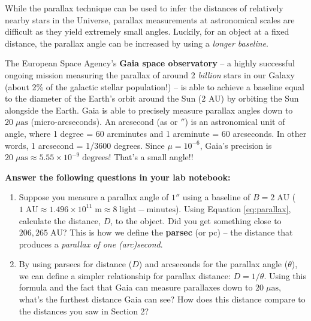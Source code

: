 \documentclass[11pt]{article}
\begin{document}
While the parallax technique can be used to infer the distances of relatively nearby stars in the Universe, parallax measurements at astronomical scales are difficult as they yield extremely small angles. Luckily, for an object at a fixed distance, the parallax angle can be increased by using a \emph{longer baseline}. 

\medskip \noindent
The European Space Agency's \textbf{Gaia space observatory} -- a highly successful ongoing mission measuring the parallax of around 2 \emph{billion} stars in our Galaxy (about 2\% of the galactic stellar population!) -- is able to achieve a baseline equal to the diameter of the Earth's orbit around the Sun (2 AU) by orbiting the Sun alongside the Earth. Gaia is able to precisely measure parallax angles down to $20\;\mu\mathrm{as}$ (micro-arcseconds). An arcsecond (as or $''$) is an astronomical unit of angle, where 1 degree = 60 arcminutes and 1 arcminute = 60 arcseconds. In other words, 1 arcsecond = 1/3600 degrees. Since $\mu = 10^{-6}$, Gaia's precision is $20\;\mu\mathrm{as}\approx 5.55\times 10^{-9}\;\mathrm{degrees}$! That's a small angle!!

\textbf{Answer the following questions in your lab notebook:}

\begin{enumerate}[resume]
    \item Suppose you measure a parallax angle of $1''$ using a baseline of $B=2\;\mathrm{AU}$ ($1\;\mathrm{AU} \approx 1.496\times 10^{11}\;\mathrm{m} \approx 8\;\mathrm{light{-}minutes}$). Using Equation \ref{eq:parallax}, calculate the distance, $D$, to the object. Did you get something close to $206,265\;\mathrm{AU}$? This is how we define the \textbf{parsec} (or pc) -- the distance that produces a \emph{parallax of one (arc)second}.
    
    \item By using parsecs for distance ($D$) and arcseconds for the parallax angle ($\theta$), we can define a simpler relationship for parallax distance: $D = 1/\theta$. Using this formula and the fact that Gaia can measure parallaxes down to $20\;\mu\mathrm{as}$, what's the furthest distance Gaia can see? How does this distance compare to the distances you saw in Section 2? 
\end{enumerate}
\end{document}
